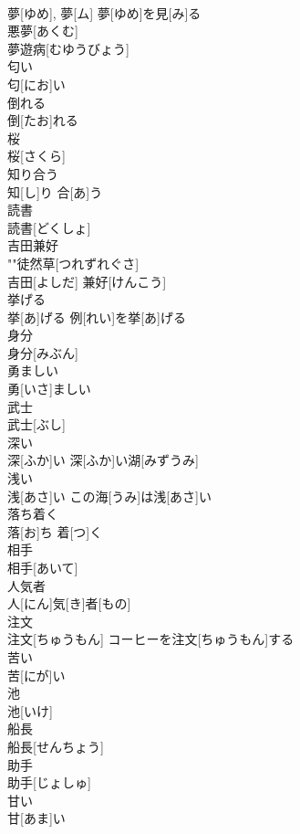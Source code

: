 \documentclass[8pt]{extreport}
\begin{document}
\begin{CJK}{UTF8}{min}
\\	夢[ゆめ], 夢[ム]	夢[ゆめ]を見[み]る 
\\	悪夢[あくむ] 
\\	夢遊病[むゆうびょう] 
\\	匂い	
\\	匂[にお]い	
\\	倒れる	
\\	倒[たお]れる	
\\	桜	
\\	桜[さくら]	
\\	知り合う	
\\	知[し]り 合[あ]う	
\\	読書	
\\	読書[どくしょ]	
\\	吉田兼好	
\\	""徒然草[つれずれぐさ] 
\\	吉田[よしだ] 兼好[けんこう]	
\\	挙げる	
\\	挙[あ]げる	例[れい]を挙[あ]げる 
\\	身分	
\\	身分[みぶん]	
\\	勇ましい	
\\	勇[いさ]ましい	
\\	武士	
\\	武士[ぶし]	
\\	深い	
\\	深[ふか]い	深[ふか]い湖[みずうみ] 
\\	浅い	
\\	浅[あさ]い	この海[うみ]は浅[あさ]い 
\\	落ち着く	
\\	落[お]ち 着[つ]く	
\\	相手	
\\	相手[あいて]	
\\	人気者	
\\	人[にん]気[き]者[もの]	
\\	注文	
\\	注文[ちゅうもん]	コーヒーを注文[ちゅうもん]する 
\\	苦い	
\\	苦[にが]い	
\\	池	
\\	池[いけ]	
\\	船長	
\\	船長[せんちょう]	
\\	助手	
\\	助手[じょしゅ]	
\\	甘い	
\\	甘[あま]い	

\end{CJK}
\end{document}
